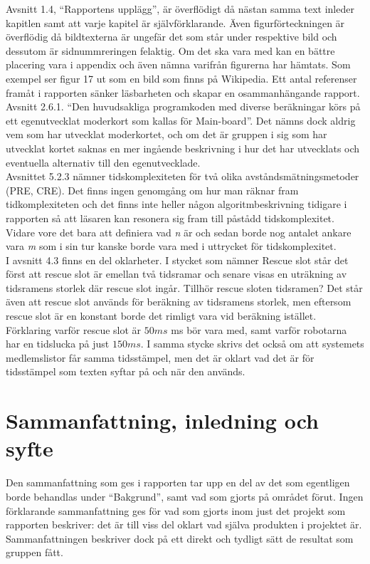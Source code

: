 \documentclass[a4paper,11pt]{article}
\begin{document}
Avsnitt 1.4, “Rapportens upplägg”, är överflödigt då nästan samma text inleder kapitlen samt att varje kapitel är självförklarande. Även figurförteckningen är överflödig då bildtexterna är ungefär det som står under respektive bild och dessutom är sidnummreringen felaktig. Om det ska vara med kan en bättre placering vara i appendix och även nämna varifrån figurerna har hämtats. Som exempel ser figur 17 ut som en bild som finns på Wikipedia. Ett antal referenser framåt i rapporten sänker läsbarheten och skapar en osammanhängande rapport.\\

Avsnitt 2.6.1. “Den huvudsakliga programkoden med diverse beräkningar körs på ett egenutvecklat moderkort som kallas för Main-board”. Det nämns dock aldrig vem som har utvecklat moderkortet, och om det är gruppen i sig som har utvecklat kortet saknas en mer ingående beskrivning i hur det har utvecklats och eventuella alternativ till den egenutvecklade.\\

Avsnittet 5.2.3 nämner tidskomplexiteten för två olika avståndsmätningsmetoder (PRE, CRE). Det finns ingen genomgång om hur man räknar fram tidkomplexiteten och det finns inte heller någon algoritmbeskrivning tidigare i rapporten så att läsaren kan resonera sig fram till påstådd tidskomplexitet. Vidare vore det bara att definiera vad \emph{n} är och sedan borde nog antalet ankare vara \emph{m} som i sin tur kanske borde vara med i uttrycket för tidskomplexitet. \\

I avsnitt 4.3 finns en del oklarheter. I stycket som nämner Rescue slot står det först att rescue slot är emellan två tidsramar och senare visas en uträkning av tidsramens storlek där rescue slot ingår. Tillhör rescue sloten tidsramen? Det står även att rescue slot används för beräkning av tidsramens storlek, men eftersom rescue slot är en konstant borde det rimligt vara vid beräkning istället. Förklaring varför rescue slot är $50 ms$ ms bör vara med, samt varför robotarna har en tidslucka på just $150 ms$. I samma stycke skrivs det också om att systemets medlemslistor får samma tidsstämpel, men det är oklart vad det är för tidsstämpel som texten syftar på och när den används.

\section{Sammanfattning, inledning och syfte}
Den sammanfattning som ges i rapporten tar upp en del av det som egentligen borde behandlas under “Bakgrund”, samt vad som gjorts på området förut. Ingen förklarande sammanfattning ges för vad som gjorts inom just det projekt som rapporten beskriver: det är till viss del oklart vad själva produkten i projektet är. Sammanfattningen beskriver dock på ett direkt och tydligt sätt de resultat som gruppen fått.
\end{document}
